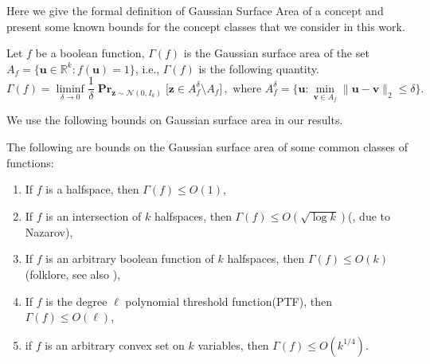 \documentclass{theoretics}
\newcommand\twonorm[1]{\|#1\|_2}
\renewcommand\vec[1]{\mathbf{#1}}
\DeclareMathOperator*{\pr}{\mathbf{Pr}}
\newcommand{\R}{\mathbb{R}}
\newcommand{\1}{\Ind}
\renewcommand{\vv}{\vec v}
\newcommand{\vu}{\vec u}
\newcommand{\z}{\vec z}
\newcommand{\Gauss}{\mathcal{N}}
\begin{document}
Here we give the formal definition of Gaussian Surface Area of a concept and present some known
bounds for the concept classes that we consider in this work.

\begin{definition}
\label{def:GSA}
Let $f$ be a boolean function, $\Gamma(f)$ is the Gaussian surface area of the set $A_f = \{\vu\in \R^k: f(\vu) = 1\}$, i.e., $\Gamma(f)$ is the following quantity.
\[
    \Gamma(f) = \liminf_{\delta \to 0} \frac{1}{\delta} \pr_{\z\sim\Gauss(0,I_k)}\bigr[\z \in A_f^\delta \setminus A_f\bigr]\,, \text{ where }A_f^\delta = \{\vu: \min_{\vv\in A_f}\twonorm{\vu-\vv} \le \delta\}.
\]
\end{definition}

We use the following bounds on Gaussian surface area in our results.
\begin{lemma}
\label{lem:gsa_bounds}
The following are bounds on the Gaussian surface area of some common classes of functions:
\begin{enumerate}
    \item If $f$ is a halfspace, then $\Gamma(f)\leq O(1)$\cite{KOS:08},
    \item If $f$ is an intersection of $k$ halfspaces, then $\Gamma(f)\leq O(\sqrt{\log k})$(\cite{KOS:08}, due to Nazarov),
    \item If $f$ is an arbitrary boolean function of $k$ halfspaces, then $\Gamma(f)\leq O(k)$
    (folklore, see also ),
    \item If $f$ is the degree $\ell$ polynomial threshold function(PTF), then $\Gamma(f)\leq O(\ell)$\cite{Kane11},
    \item if $f$ is an arbitrary convex set on $k$ variables, then $\Gamma(f)\leq O(k^{1/4})$\cite{Ball:93}.
\end{enumerate}
\end{lemma}
\end{document}
